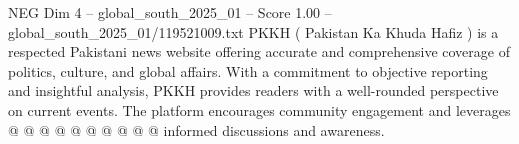 \begin{textsample}{NEG Dim 4 – global\_south\_2025\_01 – Score 1.00 – global\_south\_2025\_01/119521009.txt}
PKKH ( Pakistan Ka Khuda Hafiz ) is a respected Pakistani news website offering accurate and comprehensive coverage of politics, culture, and global affairs.
With a commitment to objective reporting and insightful analysis, PKKH provides readers with a well-rounded perspective on current events.
The platform encourages community engagement and leverages @ @ @ @ @ @ @ @ @ @ informed discussions and awareness.

\end{textsample}
